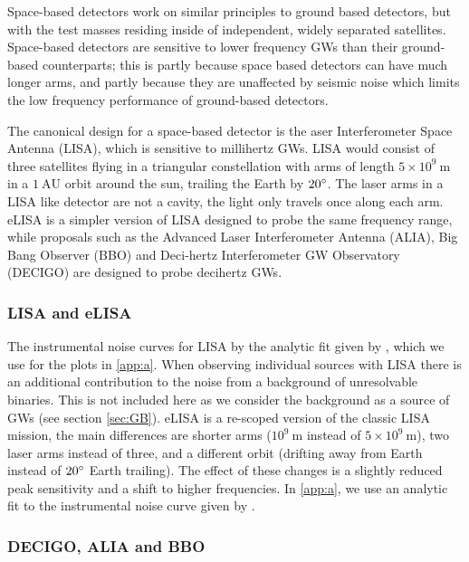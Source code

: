 Space-based detectors work on similar principles to ground based detectors, but with the test masses residing inside of independent, widely separated satellites. Space-based detectors are sensitive to lower frequency GWs than their ground-based counterparts; this is partly because space based detectors can have much longer arms, and partly because they are unaffected by seismic noise which limits the low frequency performance of ground-based detectors. 

The canonical design for a space-based detector is the aser Interferometer Space Antenna (LISA), which is sensitive to millihertz GWs. LISA would consist of three satellites flying in a triangular constellation with arms of length $5\times 10^{9}~\mathrm{m}$ in a $1~\mathrm{AU}$ orbit around the sun, trailing the Earth by $20^\circ$. The laser arms in a LISA like detector are not a cavity, the light only travels once along each arm. eLISA is a simpler version of LISA designed to probe the same frequency range, while proposals such as the Advanced Laser Interferometer Antenna (ALIA), Big Bang Observer (BBO) and Deci-hertz Interferometer GW Observatory (DECIGO) are designed to probe decihertz GWs.

\subsubsection{LISA and eLISA}

The instrumental noise curves for LISA by the analytic fit given by \citet{Sathyaprakash}, which we use for the plots in \ref{app:a}. When observing individual sources with LISA there is an additional contribution to the noise from a background of unresolvable binaries. This is not included here as we consider the background as a source of GWs (see section \ref{sec:GB}). eLISA is a re-scoped version of the classic LISA mission, the main differences are shorter arms ($10^{9}~\mathrm{m}$ instead of $5\times 10^{9}~\mathrm{m}$), two laser arms instead of three, and a different orbit (drifting away from Earth instead of $20^\circ$ Earth trailing). The effect of these changes is a slightly reduced peak sensitivity and a shift to higher frequencies. In \ref{app:a}, we use an analytic fit to the instrumental noise curve given by \citet{Amaro-Seoane-et-al}.

\subsubsection{DECIGO, ALIA and BBO}


